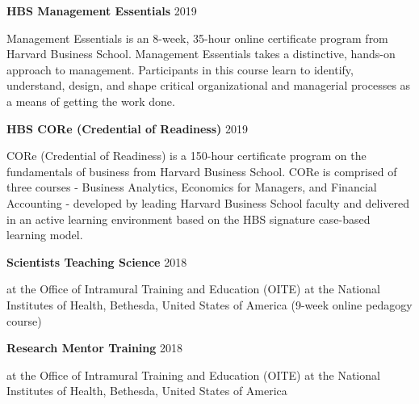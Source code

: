 \documentclass[margin,line]{res}
\begin{document}
\begin{resume}
\vspace*{-2mm}

{\bf HBS Management Essentials} \hfill {2019}\\
\vspace*{-3.5mm}
\begin{addmargin}[0pt]{.1\linewidth}
\vspace*{-1mm}
Management Essentials is an 8-week, 35-hour online certificate program from Harvard Business School. Management Essentials takes a distinctive, hands-on approach to management. Participants in this course learn to identify, understand, design, and shape critical organizational and managerial processes as a means of getting the work done.
\end{addmargin}

\vspace*{-2mm}

{\bf HBS CORe (Credential of Readiness)} \hfill {2019}\\
\vspace*{-3.5mm}
\begin{addmargin}[0pt]{.1\linewidth}
\vspace*{-1mm}
CORe (Credential of Readiness) is a 150-hour certificate program on the fundamentals of business from Harvard Business School. CORe is comprised of three courses - Business Analytics, Economics for Managers, and Financial Accounting - developed by leading Harvard Business School faculty and delivered in an active learning environment based on the HBS signature case-based learning model.
\end{addmargin}

\vspace*{-2mm}

{\bf Scientists Teaching Science} \hfill {2018}\\
\vspace*{-3.5mm}
\begin{addmargin}[0pt]{.1\linewidth}
\vspace*{-1mm}
at the Office of Intramural Training and Education (OITE) at the National Institutes of Health, Bethesda, United States of America (9-week online pedagogy course)
\end{addmargin}

\vspace*{-2mm}

{\bf Research Mentor Training} \hfill {2018}\\
\vspace*{-3.5mm}
\begin{addmargin}[0pt]{.1\linewidth}
\vspace*{-1mm}
at the Office of Intramural Training and Education (OITE) at the National Institutes of Health, Bethesda, United States of America 
\end{addmargin}


\end{resume}
\end{document}
